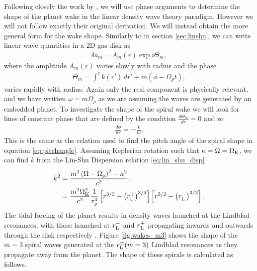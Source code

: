 Following closely the work by \citet{ogilvie2002}, we will use phase arguments to determine the shape of the planet wake in the linear density wave theory paradigm.
However we will not follow exactly their original derivation.
We will instead obtain the more general form for the wake shape.
Similarly to in section \ref{sec:linshu}, we can write linear wave quantities in a 2D gas disk as 
\begin{align}
    \delta a_m = A_m(r) \exp{i \Theta_m},
\end{align}
where the amplitude $A_m(r)$ varies slowly with radius and the phase
\begin{align}
    \Theta_m = \int^r k(r') \, dr' + m (\phi - \Omega_p t),
\end{align}
varies rapidly with radius. 
Again only the real component is physically relevant, and we have written $\omega = m \Omega_p$ as we are assuming the waves are generated by an embedded planet.
To investigate the shape of the spiral wake we will look for lines of constant phase that are defined by the condition $\frac{d\Theta_m}{dr} = 0$ and so 
\begin{align}
    \frac{d\phi}{dr} = - \frac{k}{m}. \label{eq:spiral_km}
\end{align}
This is the same as the relation used to find the pitch angle of the spiral shape in equation \ref{eq:pitchangle}.
Assuming Keplerian rotation such that $\kappa=\Omega=\Omega_{\rm K}$, we can find $k$ from the Lin-Shu Dispersion relation \ref{eq:lin_shu_disp}
\begin{align}
    k^2 &= \frac{m^2 \left( \Omega - \Omega_{\rm p} \right)^2 - \kappa^2}{c^2}, \\
    &= \frac{m^2 \Omega_{\rm K}^2}{c^2} \frac{1}{r_{\rm p}^3} \left[ r^{3/2} - \left( r_{\rm L}^+ \right)^{3/2} \right] \left[ r^{3/2} - \left( r_{\rm L}^- \right)^{3/2} \right].
\end{align}
The tidal forcing of the planet results in density waves launched at the Lindblad resonances, with those launched at $r_{\rm L}^-$ and $r_{\rm L}^+$ propagating inwards and outwards through the disk respectively \citep{goldreich1978,goldreich1979}.
Figure \ref{fig:wakes_m3} shows the shape of the $m=3$ spiral waves generated at the $r_{\rm L}^\pm (m=3)$ Lindblad resonances as they propagate away from the planet.
The shape of these spirals is calculated as follows.
